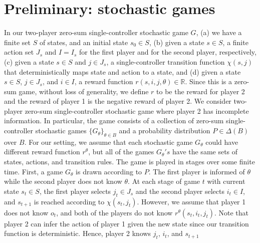 \section{Preliminary: stochastic games} \label{stochastic_games}
In our two-player zero-sum single-controller stochastic game $G$, 
(a) we have a finite set $S$ of states, 
and an initial state $s_0 \in S$, 
(b) given a state $s \in S$, a finite action set $J_{s}$ and $I=I_s$ 
for the first player and for the second player, respectively, 
(c) given a state $s \in S$ and $j \in J_s$, a single-controller transition function
$\chi(s, j)$ that deterministically maps state and action to a state, 
and (d) given a state $s \in S$, $j \in J_s$, and $i \in I$, 
a reward function $r(s,i,j,\theta) \in \mathbb{R}$. 
Since this is a zero-sum game, without loss of generality, 
we define $r$ to be the reward for player 2 and 
the reward of player 1 is the negative reward of player 2. 
We consider two-player zero-sum single-controller stochastic game 
where player 2 has incomplete information. 
In particular, the game consists of a collection of zero-sum 
single-controller stochastic games $\{G_\theta\}_{\theta \in B}$ 
and a probability distribution $P \in \Delta(B)$ over $B$. 
For our setting, we assume that each stochastic game 
$G_\theta$ could have different reward function $r^\theta$, but 
all of the games $G_\theta's$ have the same sets of states, actions, and transition rules. 
The game is played in stages over some finite time. 
First, a game $G_\theta$ is drawn according to $P$. 
The first player is informed of $\theta$
while the second player does not know $\theta$. 
At each stage of game $t$ with current state $s_t \in S$, 
the first player selects $j_t \in J_s$ 
and the second player selects $i_t \in I$, 
and $s_{t+1}$ is reached according to $\chi(s_t, j_t)$.
However, we assume that player 1 does not know $o_t$, 
and both of the players do not know $r^\theta(s_t, i_t, j_t)$. Note that 
player 2 can infer the action of player 1 given the new state 
since our transition function is deterministic. Hence,
player 2 knows $j_t$, $i_t$, and $s_{t+1}$

